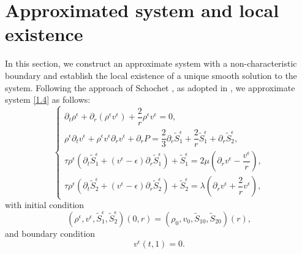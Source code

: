\documentclass[10pt,reqno]{amsart}
\numberwithin{equation}{section}
\begin{document}
	\section{Approximated system and local  existence}\label{sec2}
	In this section, we construct an approximate system with a non-characteristic boundary and establish the local existence of a unique smooth solution to the system. Following the approach of Schochet \cite{schochet1986compressible}, as adopted in \cite{HL24, HZ25}, we approximate system \eqref{1.4} as follows:
	\begin{equation} \label{9}
		\begin{cases}
			\partial_t \rho^{\epsilon}+\partial_r(\rho^{\epsilon} v^{\epsilon})+\dfrac{2}{r} \rho^{\epsilon} v^{\epsilon}=0, \\
			\rho^{\epsilon}\partial_t v^{\epsilon}+\rho^{\epsilon} v^{\epsilon} \partial_r v^{\epsilon}+\partial_r P=\dfrac{2}{3}\partial_r \tilde{S}_1^{\epsilon} +\dfrac{2}{r} \tilde{S}_1^{\epsilon}+\partial_r \tilde{S}_2^{\epsilon},\\
			\tau   \rho^{\epsilon} \left(\partial_t \tilde{S}_1^{\epsilon}+(v^{\epsilon}-\epsilon)\partial_r\tilde{S}_1^{\epsilon} \right) +\tilde{S}_1^{\epsilon}=2\mu(\partial_r v^{\epsilon}- \dfrac{v^{\epsilon}}{r})
			, \\
			\tau  \rho^{\epsilon} \left(\partial_t \tilde{S}_2^{\epsilon}+(v^{\epsilon}-\epsilon)\partial_r\tilde{S}_2^{\epsilon} \right) +\tilde{S}_2^{\epsilon}=\lambda (\partial_r v^{\epsilon}+\dfrac{2}{r}v^{\epsilon}),
		\end{cases}
	\end{equation}
	with initial condition
	\begin{equation}\label{10}
		(\rho^\epsilon,v^\epsilon,\tilde{S}_1^{\epsilon},\tilde{S}_2^{\epsilon})(0,r)=(\rho_0,v_0,\tilde{S}_{10},\tilde{S}_{20})(r),
	\end{equation}
	and boundary condition
	\begin{equation}\label{11}
		v^\epsilon(t,1)=0.
	\end{equation}
	
\end{document}
